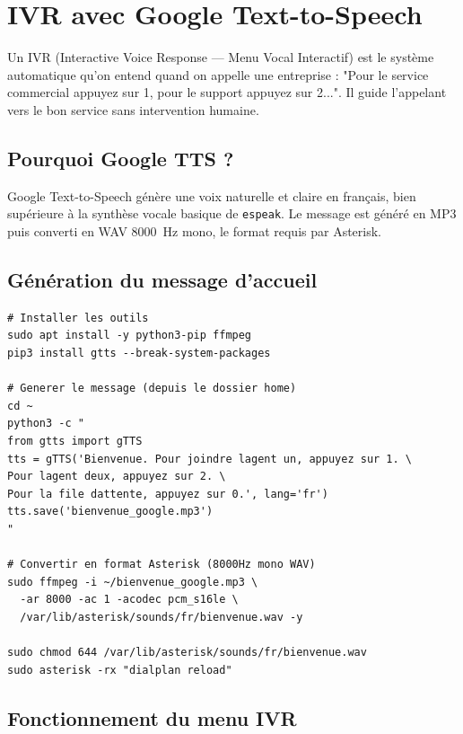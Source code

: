 \documentclass[a4paper,11pt]{report}
\begin{document}
\section{IVR avec Google Text-to-Speech}

\begin{infobox}
Un IVR (Interactive Voice Response — Menu Vocal Interactif) est le système automatique qu'on entend quand on appelle une entreprise : "Pour le service commercial appuyez sur 1, pour le support appuyez sur 2...". Il guide l'appelant vers le bon service sans intervention humaine.
\end{infobox}

\subsection{Pourquoi Google TTS ?}

Google Text-to-Speech génère une voix naturelle et claire en français, bien supérieure à la synthèse vocale basique de \texttt{espeak}. Le message est généré en MP3 puis converti en WAV 8000~Hz mono, le format requis par Asterisk.

\subsection{Génération du message d'accueil}

\begin{codebox}
\begin{lstlisting}
# Installer les outils
sudo apt install -y python3-pip ffmpeg
pip3 install gtts --break-system-packages

# Generer le message (depuis le dossier home)
cd ~
python3 -c "
from gtts import gTTS
tts = gTTS('Bienvenue. Pour joindre lagent un, appuyez sur 1. \
Pour lagent deux, appuyez sur 2. \
Pour la file dattente, appuyez sur 0.', lang='fr')
tts.save('bienvenue_google.mp3')
"

# Convertir en format Asterisk (8000Hz mono WAV)
sudo ffmpeg -i ~/bienvenue_google.mp3 \
  -ar 8000 -ac 1 -acodec pcm_s16le \
  /var/lib/asterisk/sounds/fr/bienvenue.wav -y

sudo chmod 644 /var/lib/asterisk/sounds/fr/bienvenue.wav
sudo asterisk -rx "dialplan reload"
\end{lstlisting}
\end{codebox}

\subsection{Fonctionnement du menu IVR}
\end{document}
